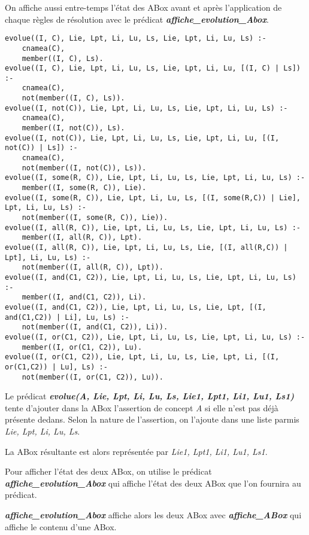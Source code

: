\documentclass{rapportECL}
\begin{document}
On affiche aussi entre-temps l'état des ABox avant et après l'application de chaque règles de résolution avec le prédicat \textbf{\textit{affiche\_evolution\_Abox}}.

\begin{lstlisting}[style=prologStyle, caption={Évolution de la ABox suite à l'ajout d'une assertion}, label={evolue}]
evolue((I, C), Lie, Lpt, Li, Lu, Ls, Lie, Lpt, Li, Lu, Ls) :-
    cnamea(C),
    member((I, C), Ls).
evolue((I, C), Lie, Lpt, Li, Lu, Ls, Lie, Lpt, Li, Lu, [(I, C) | Ls]) :-
    cnamea(C),
    not(member((I, C), Ls)).
evolue((I, not(C)), Lie, Lpt, Li, Lu, Ls, Lie, Lpt, Li, Lu, Ls) :-
    cnamea(C),
    member((I, not(C)), Ls).
evolue((I, not(C)), Lie, Lpt, Li, Lu, Ls, Lie, Lpt, Li, Lu, [(I, not(C)) | Ls]) :-
    cnamea(C),
    not(member((I, not(C)), Ls)).
evolue((I, some(R, C)), Lie, Lpt, Li, Lu, Ls, Lie, Lpt, Li, Lu, Ls) :-
    member((I, some(R, C)), Lie).
evolue((I, some(R, C)), Lie, Lpt, Li, Lu, Ls, [(I, some(R,C)) | Lie], Lpt, Li, Lu, Ls) :-
    not(member((I, some(R, C)), Lie)).
evolue((I, all(R, C)), Lie, Lpt, Li, Lu, Ls, Lie, Lpt, Li, Lu, Ls) :-
    member((I, all(R, C)), Lpt).
evolue((I, all(R, C)), Lie, Lpt, Li, Lu, Ls, Lie, [(I, all(R,C)) | Lpt], Li, Lu, Ls) :-
    not(member((I, all(R, C)), Lpt)).
evolue((I, and(C1, C2)), Lie, Lpt, Li, Lu, Ls, Lie, Lpt, Li, Lu, Ls) :-
    member((I, and(C1, C2)), Li).
evolue((I, and(C1, C2)), Lie, Lpt, Li, Lu, Ls, Lie, Lpt, [(I, and(C1,C2)) | Li], Lu, Ls) :-
    not(member((I, and(C1, C2)), Li)).
evolue((I, or(C1, C2)), Lie, Lpt, Li, Lu, Ls, Lie, Lpt, Li, Lu, Ls) :-
    member((I, or(C1, C2)), Lu).
evolue((I, or(C1, C2)), Lie, Lpt, Li, Lu, Ls, Lie, Lpt, Li, [(I, or(C1,C2)) | Lu], Ls) :-
    not(member((I, or(C1, C2)), Lu)).
\end{lstlisting}

Le prédicat \textbf{\textit{evolue(A, Lie, Lpt, Li, Lu, Ls, Lie1, Lpt1, Li1, Lu1, Ls1)}} tente d'ajouter dans la ABox l'assertion de concept \textit{A} si elle n'est pas déjà présente dedans. Selon la nature de l'assertion, on l'ajoute dans une liste parmis \textit{Lie, Lpt, Li, Lu, Ls}.

La ABox résultante est alors représentée par \textit{Lie1, Lpt1, Li1, Lu1, Ls1}.


Pour afficher l'état des deux ABox, on utilise le prédicat \textbf{\textit{affiche\_evolution\_Abox}} qui affiche l'état des deux ABox que l'on fournira au prédicat.

\textbf{\textit{affiche\_evolution\_Abox}} affiche alors les deux ABox avec \textbf{\textit{affiche\_ABox}} qui affiche le contenu d'une ABox.
\end{document}
